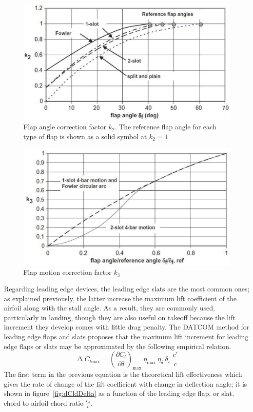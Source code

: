 %
\begin{figure}[H]
\centering
\includegraphics[width=0.8\linewidth]{K2}
\caption{Flap angle correction factor $k_2$. The reference flap angle for each type of flap is shown as a solid symbol at $k_2=1$}
\label{fig:k2}
\end{figure}
%
\begin{figure}[H]
\centering
\includegraphics[width=0.8\linewidth]{K3}
\caption{Flap motion correction factor $k_3$}
\label{fig:k3}
\end{figure}
%
\noindent
Regarding leading edge devices, the leading edge slats are the most common ones; as explained previously, the latter increase the maximum lift coefficient of the airfoil along with the stall angle. As a result, they are commonly used, particularly in landing, though they are also useful on takeoff because the lift increment they develop comes with little drag penalty.
%
The \gls{DATCOM} method for leading edge flaps and slats proposes that the maximum lift increment for leading edge flaps or slats may be approximated by the following empirical relation.
%
\begin{equation}
\upDelta C_{l\text{max}}=\left(\dfrac{\partial C_l}{\partial \delta}\right)_{\text{max}}\ \eta_{\text{max}}\ \eta_\delta\ \delta_s\ \dfrac{c'}{c}
\label{eqn:DeltaClmaxSlat}
\end{equation}
%
\noindent
The first term in the previous equation is the theoretical lift effectiveness which gives the rate of change of the lift coefficient with change in deflection angle; it is shown in figure~\ref{fig:dCldDelta} as a function of the leading edge flap, or slat, chord to airfoil-chord ratio $\frac{c_s}{c}$.
